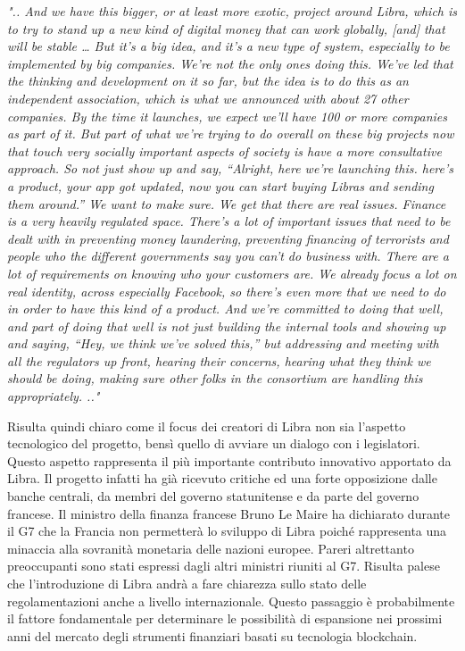 \textit{".. And we have this bigger, or at least more exotic, project around Libra, which is to try to stand up a new kind of digital money that can work globally, [and] that will be stable … But it’s a big idea, and it’s a new type of system, especially to be implemented by big companies. We’re not the only ones doing this. We’ve led that the thinking and development on it so far, but the idea is to do this as an independent association, which is what we announced with about 27 other companies. By the time it launches, we expect we’ll have 100 or more companies as part of it. But part of what we’re trying to do overall on these big projects now that touch very socially important aspects of society is have a more consultative approach. So not just show up and say, “Alright, here we’re launching this. here’s a product, your app got updated, now you can start buying Libras and sending them around.” We want to make sure. We get that there are real issues. Finance is a very heavily regulated space. There’s a lot of important issues that need to be dealt with in preventing money laundering, preventing financing of terrorists and people who the different governments say you can’t do business with. There are a lot of requirements on knowing who your customers are. We already focus a lot on real identity, across especially Facebook, so there’s even more that we need to do in order to have this kind of a product. And we’re committed to doing that well, and part of doing that well is not just building the internal tools and showing up and saying, “Hey, we think we’ve solved this,” but addressing and meeting with all the regulators up front, hearing their concerns, hearing what they think we should be doing, making sure other folks in the consortium are handling this appropriately. .."}

Risulta quindi chiaro come il focus dei creatori di Libra non sia l'aspetto tecnologico del progetto, bensì quello di avviare un dialogo con i legislatori.  Questo aspetto rappresenta il più importante contributo innovativo apportato da Libra. Il progetto infatti ha già ricevuto critiche ed una forte opposizione dalle banche centrali, da membri del governo statunitense e da parte del governo francese. Il ministro della finanza francese Bruno Le Maire ha dichiarato durante il G7 che la Francia non permetterà lo sviluppo di Libra poiché rappresenta una minaccia alla sovranità monetaria delle nazioni europee. Pareri altrettanto preoccupanti sono stati espressi dagli altri ministri riuniti al G7. Risulta palese che l'introduzione di Libra andrà a fare chiarezza sullo stato delle regolamentazioni anche a livello internazionale. Questo passaggio è probabilmente il fattore fondamentale per determinare le possibilità di espansione nei prossimi anni del mercato degli strumenti finanziari basati su tecnologia blockchain. 

